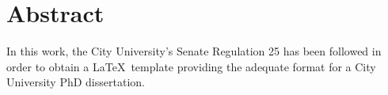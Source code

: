\chapter*{Abstract}

In this work, the City University's Senate Regulation 25 \citep{senate_regulation_25} has been followed in order to obtain a \LaTeX\ template providing the adequate format for a City University PhD dissertation.






